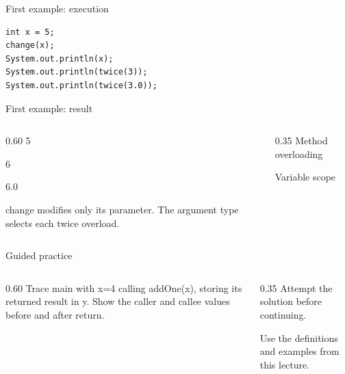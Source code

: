 \documentclass[10pt,aspectratio=169]{beamer}
\begin{document}
\begin{frame}[fragile,t]{First example: execution}
\begin{lstlisting}
int x = 5;
change(x);
System.out.println(x);
System.out.println(twice(3));
System.out.println(twice(3.0));
\end{lstlisting}
\end{frame}

\begin{frame}[fragile,t]{First example: result}
\begin{columns}[T,onlytextwidth]\begin{column}{0.60\textwidth}
5\par 6\par 6.0\par change modifies only its parameter. The argument type selects each twice overload.
\end{column}\begin{column}{0.35\textwidth}\small
Method overloading

Variable scope
\end{column}\end{columns}
\end{frame}

\begin{frame}[fragile,t]{Guided practice}
\begin{columns}[T,onlytextwidth]\begin{column}{0.60\textwidth}
Trace main with x=4 calling addOne(x), storing its returned result in y. Show the caller and callee values before and after return.
\end{column}\begin{column}{0.35\textwidth}\small
Attempt the solution before continuing.

Use the definitions and examples from this lecture.
\end{column}\end{columns}
\end{frame}
\end{document}
